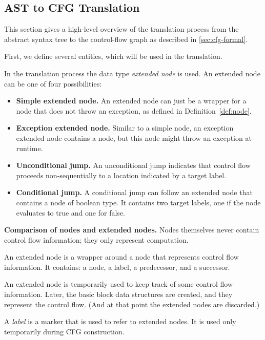 \subsection{AST to CFG Translation}
\label{sec:ast_to_cfg_translation}

This section gives a high-level overview of the translation process
from the abstract syntax tree to the control-flow graph as described
in \autoref{sec:cfg-formal}.

First, we define several entities, which will be used in the translation.

\begin{definition}
    In the translation process the data type \emph{extended node} is used.
    An extended node can be one of four possibilities:
    \begin{itemize}
        \item \textbf{Simple extended node.} An extended node can just be a
          wrapper for a node that does not throw an exception,
          as defined in Definition~\ref{def:node}.
        \item \textbf{Exception extended node.} Similar to a simple
          node, an exception extended node contains a node, but this
          node might throw an exception at runtime.
        \item \textbf{Unconditional jump.} An unconditional jump
          indicates that control flow proceeds non-sequentially to a
          location indicated by a target label.
        \item \textbf{Conditional jump.} A conditional jump can follow
          an extended node that contains a node of boolean type. It
          contains two target labels, one if the node evaluates to
          true and one for false.
    \end{itemize}
\end{definition}

\textbf{Comparison of nodes and extended nodes.}
Nodes themselves never contain control flow information; they only
represent computation.

An extended node is a wrapper around a node that represents control flow
information.  It contains:  a node, a label, a predecessor, and a
successor.

An extended node is temporarily used to keep track of some control flow
information.  Later, the basic block data structures are created, and they
represent the control flow.  (And at that point the extended nodes are
discarded.)
\begin{definition}[Label]
    A \emph{label} is a marker that is used to refer to extended
    nodes. It is used only temporarily during CFG construction.
\end{definition}

